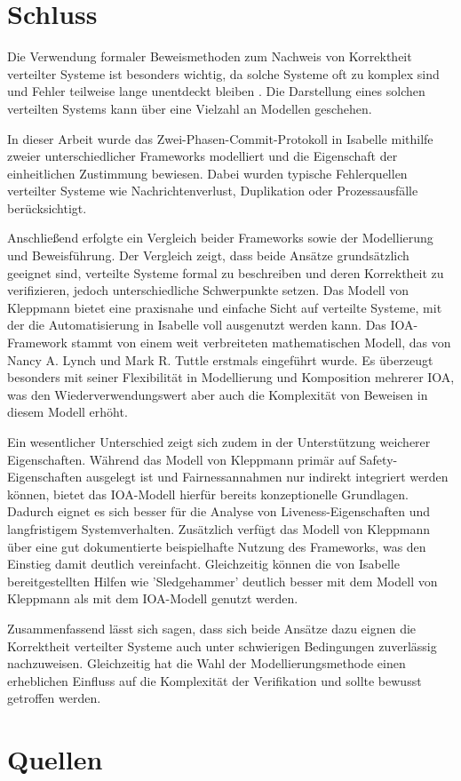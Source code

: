 \documentclass[12pt,a4paper]{tucarticle2019}
\begin{document}
	\newpage
	\section{Schluss}
	Die Verwendung formaler Beweismethoden zum Nachweis von Korrektheit verteilter Systeme ist besonders wichtig, da solche Systeme oft zu komplex sind und Fehler teilweise lange unentdeckt bleiben \cite{kleppmannblog}. Die Darstellung eines solchen verteilten Systems kann über eine Vielzahl an Modellen geschehen.
	
	In dieser Arbeit wurde das Zwei-Phasen-Commit-Protokoll in Isabelle mithilfe zweier unterschiedlicher Frameworks modelliert und die Eigenschaft der einheitlichen Zustimmung bewiesen. Dabei wurden typische Fehlerquellen verteilter Systeme wie Nachrichtenverlust, Duplikation oder Prozessausfälle berücksichtigt.
	
	Anschließend erfolgte ein Vergleich beider Frameworks sowie der Modellierung und Beweisführung. Der Vergleich zeigt, dass beide Ansätze grundsätzlich geeignet sind, verteilte Systeme formal zu beschreiben und deren Korrektheit zu verifizieren, jedoch unterschiedliche Schwerpunkte setzen.
	Das Modell von Kleppmann bietet eine praxisnahe und einfache Sicht auf verteilte Systeme, mit der die Automatisierung in Isabelle voll ausgenutzt werden kann.
	Das IOA-Framework stammt von einem weit verbreiteten mathematischen Modell, das von Nancy A. Lynch und Mark R. Tuttle erstmals eingeführt wurde. Es überzeugt besonders mit seiner Flexibilität in Modellierung und Komposition mehrerer IOA, was den Wiederverwendungswert aber auch die Komplexität von Beweisen in diesem Modell erhöht.
	
	Ein wesentlicher Unterschied zeigt sich zudem in der Unterstützung weicherer Eigenschaften. Während das Modell von Kleppmann primär auf Safety-Eigenschaften ausgelegt ist und Fairnessannahmen nur indirekt integriert werden können, bietet das IOA-Modell hierfür bereits konzeptionelle Grundlagen. Dadurch eignet es sich besser für die Analyse von Liveness-Eigenschaften und langfristigem Systemverhalten. Zusätzlich verfügt das Modell von Kleppmann über eine gut dokumentierte beispielhafte Nutzung des Frameworks, was den Einstieg damit deutlich vereinfacht. Gleichzeitig können die von Isabelle bereitgestellten Hilfen wie 'Sledgehammer' deutlich besser mit dem Modell von Kleppmann als mit dem IOA-Modell genutzt werden.
	
	Zusammenfassend lässt sich sagen, dass sich beide Ansätze dazu eignen die Korrektheit verteilter Systeme auch unter schwierigen Bedingungen zuverlässig nachzuweisen. Gleichzeitig hat die Wahl der Modellierungsmethode einen erheblichen Einfluss auf die Komplexität der Verifikation und sollte bewusst getroffen werden.
	
	\newpage
	\section{Quellen}
	\printbibliography
\end{document}
